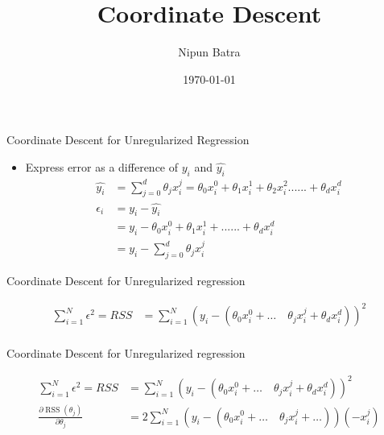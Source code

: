 \documentclass{beamer}
\title{Coordinate Descent}
\date{\today}
\author{Nipun Batra}
\institute{IIT Gandhinagar}
\begin{document}
  \maketitle
  
  
  





\begin{frame}{Coordinate Descent for Unregularized Regression}

\begin{itemize}[<+->]
    

    
    
    
    \item Express error as a difference of $y_{i}$ and $\hat{y_{i}}$
    \begin{align}
    \hat{y_i} &= \sum_{j=0}^{d} \theta_{j}x^{j}_{i} = \theta_{0}x_{i}^{0} + \theta_{1}x_{i}^{1} +\theta_{2}x_{i}^{2} ...... + \theta_{d}x_{i}^{d}  \\
    \epsilon_{i} &= y_{i} - \hat{y_{i}}\\
    &= y_{i} - \theta_{0}x_{i}^{0} + \theta_{1}x_{i}^{1} + ...... + \theta_{d}x_{i}^{d}\\
    &= y_{i} - \sum_{j=0}^{d} \theta_{j}x_{i}^{j}
    \end{align}
   
   
    
\end{itemize}
    

\end{frame}



\begin{frame}{Coordinate Descent for Unregularized regression}

\begin{align*}
    \sum_{i=1}^{N}  \epsilon^{2}=RSS &=\sum_{i=1}^{N}\left(y_{i}-\left(\theta_{0}x_{i}^{0}+\ldots \quad \theta_{j} x_{i}^{j}+\theta_{d} x_{i}^{d}\right)\right)^{2}\\
   \end{align*}
\end{frame}

\begin{frame}{Coordinate Descent for Unregularized regression}

\begin{align*}
\sum_{i=1}^{N}  \epsilon^{2}=RSS &=\sum_{i=1}^{N}\left(y_{i}-\left(\theta_{0}x_{i}^{0}+\ldots \quad \theta_{j} x_{i}^{j}+\theta_{d} x_{i}^{d}\right)\right)^{2}\\
\frac{\partial \operatorname{RSS}\left(\theta_{j}\right)}{\partial \theta_{j}}&= 2 \sum_{i=1}^{N}\left(y_{i}-\left(\theta_{0}x_{i}^{0}+\ldots \quad \theta_{j} x_{i}^{j}+\ldots \right)\right)\left(-x_{i}^{j}\right)\\
\end{align*}
\end{frame}
\end{document}

